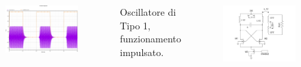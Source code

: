 \documentclass{beamer}
\begin{document}
\begin{frame}
\begin{columns}
\begin{figure}
\includegraphics[width=\textwidth]{images/tipo1-impulsato.pdf}
\end{figure}
Oscillatore di Tipo 1, funzionamento impulsato.

      \vspace{0.5cm}
      \begin{figure}
      \includegraphics[width=1.5\textwidth]{images/tipo1.pdf}
      \end{figure}
\end{columns}
\end{frame}
\end{document}
